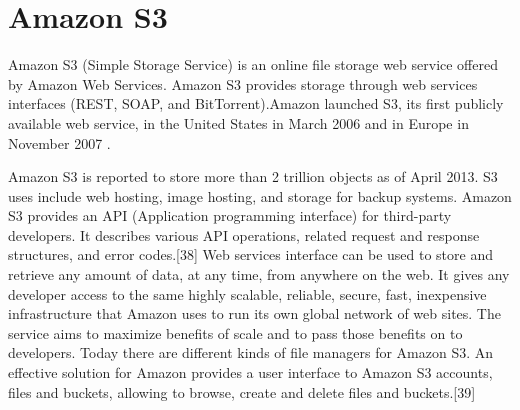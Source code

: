 \section{Amazon S3}
\label{sec:s3_s3}

Amazon S3 (Simple Storage Service) is an online file storage web service offered by Amazon Web Services. Amazon S3 provides storage through web services interfaces (REST, SOAP, and BitTorrent).Amazon launched S3, its first publicly available web service, in the United States in March 2006 and in Europe in November 2007 \cite{s3_overview}.

Amazon S3 is reported to store more than 2 trillion objects as of April 2013.\cite{s3_stats} S3 uses include web hosting, image hosting, and storage for backup systems. 
Amazon S3 provides an API (Application programming interface) for third-party developers. It describes various API operations, related request and response structures, and error codes.[38] Web services interface can be used to store and retrieve any amount of data, at any time, from anywhere on the web. It gives any developer access to the same highly scalable, reliable, secure, fast, inexpensive infrastructure that Amazon uses to run its own global network of web sites. The service aims to maximize benefits of scale and to pass those benefits on to developers. Today there are different kinds of file managers for Amazon S3. An effective solution for Amazon provides a user interface to Amazon S3 accounts, files and buckets, allowing to browse, create and delete files and buckets.[39]